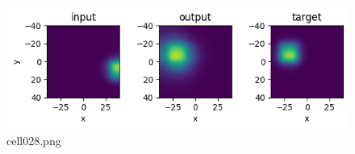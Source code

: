 \begin{figure}[ht]
	\centering
	\includegraphics[scale=0.8, max width=\linewidth]{./fig/solve-credit-assignment-problem/backpropagation/cell028.png}
	\caption{cell028.png}
	\label{cell028.png}
\end{figure}